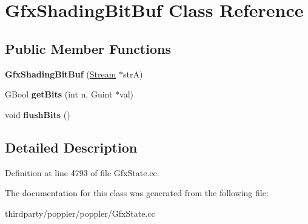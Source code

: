 \hypertarget{class_gfx_shading_bit_buf}{}\section{Gfx\+Shading\+Bit\+Buf Class Reference}
\label{class_gfx_shading_bit_buf}
\subsection*{Public Member Functions}
\begin{DoxyCompactItemize}
\item 
\mbox{\label{class_gfx_shading_bit_buf_a4040b07509017493317aa7db1f644d78}} 
{\bfseries Gfx\+Shading\+Bit\+Buf} (\hyperlink{class_stream}{Stream} $\ast$strA)
\item 
\mbox{\label{class_gfx_shading_bit_buf_aeebf24312e079945357c21fcb29273b9}} 
G\+Bool {\bfseries get\+Bits} (int n, Guint $\ast$val)
\item 
\mbox{\label{class_gfx_shading_bit_buf_a1fd1ddda0219c06f7c8dde8538d87ecd}} 
void {\bfseries flush\+Bits} ()
\end{DoxyCompactItemize}


\subsection{Detailed Description}


Definition at line 4793 of file Gfx\+State.\+cc.



The documentation for this class was generated from the following file\+:\begin{DoxyCompactItemize}
\item 
thirdparty/poppler/poppler/Gfx\+State.\+cc\end{DoxyCompactItemize}
